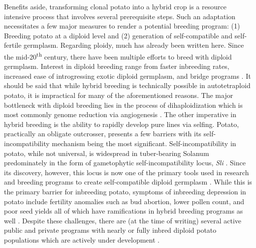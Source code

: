 \documentclass[
]{article}
\begin{document}
Benefits aside, transforming clonal potato into a hybrid crop is a
resource intensive process that involves several prerequisite steps.
Such an adaptation necessitates a few major measures to render a
potential breeding program: (1) Breeding potato at a diploid level and
(2) generation of self-compatible and self-fertile germplasm. Regarding
ploidy, much has already been written here. Since the
mid-20\textsuperscript{th} century, there have been multiple efforts to
breed with diploid germplasm. Interest in diploid breeding range from
faster inbreeding rates, increased ease of introgressing exotic diploid
germplasm, and bridge programs
\autocite{Krantz1946,Hougas1958,Chase1963}. It should be said that while
hybrid breeding is technically possible in autotetraploid potato, it is
impractical for many of the aforementioned reasons. The major bottleneck
with diploid breeding lies in the process of dihaploidization which is
most commonly genome reduction via angiogenesis
\autocite{Uijtewaal1987}. The other imperative in hybrid breeding is the
ability to rapidly develop pure lines via selfing. Potato, practically
an obligate outcrosser, presents a few barriers with its
self-incompatibility mechanism being the most significant.
Self-incompatibility in potato, while not universal, is widespread in
tuber-bearing Solanum predominately in the form of gametophytic
self-incompatibility locus, \emph{Sli} \autocite{Hosaka1998,Jing2025}.
Since its discovery, however, this locus is now one of the primary tools
used in research and breeding programs to create self-compatible diploid
germplasm \autocite{Ma2021,Eggers2021}. While this is the primary
barrier for inbreeding potato, symptoms of inbreeding depression in
potato include fertility anomalies such as bud abortion, lower pollen
count, and poor seed yields all of which have ramifications in hybrid
breeding programs as well \autocite{Pallais1987}. Despite these
challenges, there are (at the time of writing) several active public and
private programs with nearly or fully inbred diploid potato populations
which are actively under development
\autocite{Zhang2021,Song2023,DeVries2023}.
\end{document}
